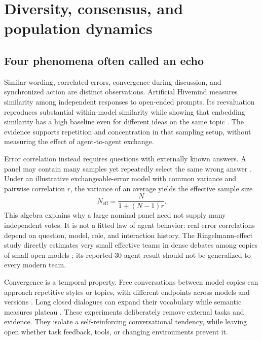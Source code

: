 \section{Diversity, consensus, and population dynamics}
\label{sec:collective}
\subsection{Four phenomena often called an echo}
Similar wording, correlated errors, convergence during discussion, and synchronized action are distinct observations. Artificial Hivemind measures similarity among independent responses to open-ended prompts. Its reevaluation reproduces substantial within-model similarity while showing that embedding similarity has a high baseline even for different ideas on the same topic \citep{artificial-hivemind,artificial-hivemind-reevaluation}. The evidence supports repetition and concentration in that sampling setup, without measuring the effect of agent-to-agent exchange.

Error correlation instead requires questions with externally known answers. A panel may contain many samples yet repeatedly select the same wrong answer \citep{consensus-not-verification}. Under an illustrative exchangeable-error model with common variance and pairwise correlation $r$, the variance of an average yields the effective sample size
\begin{equation}
N_{\mathrm{eff}}=\frac{N}{1+(N-1)r}.
\end{equation}
This algebra explains why a large nominal panel need not supply many independent votes. It is not a fitted law of agent behavior: real error correlations depend on question, model, role, and interaction history. The Ringelmann-effect study directly estimates very small effective teams in dense debates among copies of small open models \citep{ringelmann-effect}; its reported 30-agent result should not be generalized to every modern team.

Convergence is a temporal property. Free conversations between model copies can approach repetitive styles or topics, with different endpoints across models and versions \citep{attractor-states-anthropic-card,attractor-states-jakkli-post,attractor-states-ko-geiping-paper,mythos-preview-self-interactions}. Long closed dialogues can expand their vocabulary while semantic measures plateau \citep{semantic-collapse}. These experiments deliberately remove external tasks and evidence. They isolate a self-reinforcing conversational tendency, while leaving open whether task feedback, tools, or changing environments prevent it.

